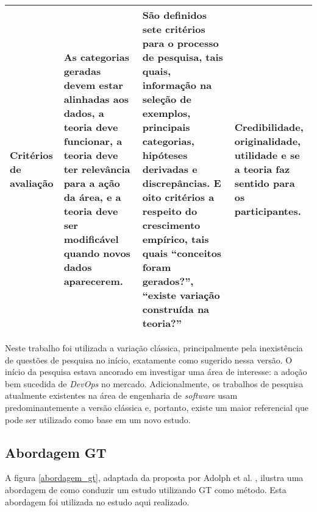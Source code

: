\begin{table}[hb!]
{\begin{tabular}{|p{3cm}|p{5.7cm}|p{5.7cm}|p{5.7cm}|}
\textbf{Critérios de avaliação}
& As categorias geradas devem estar alinhadas aos dados, a teoria deve funcionar, a teoria deve ter relevância para a ação da área, e a teoria deve ser modificável quando novos dados aparecerem.
& São definidos sete critérios para o processo de pesquisa, tais quais, informação na seleção de exemplos, principais categorias, hipóteses derivadas e discrepâncias. E oito critérios a respeito do crescimento empírico, tais quais ``conceitos foram gerados?'', ``existe variação construída na teoria?''
& Credibilidade, originalidade, utilidade e se a teoria faz sentido para os participantes. \\
\hline

\end{tabular}}
\end{table}

Neste trabalho foi utilizada a variação clássica, principalmente pela
inexistência de questões de pesquisa no início, exatamente como
sugerido nessa versão. O início da pesquisa estava ancorado em investigar uma
área de interesse: a adoção bem sucedida de \textit{DevOps} no mercado.
Adicionalmente, os trabalhos de pesquisa atualmente existentes na área
de engenharia de \textit{software} usam predominantemente a versão clássica
\cite{stol2016grounded} e, portanto, existe um maior referencial que pode ser
utilizado como base em um novo estudo.

\subsection{Abordagem \acrshort{GT}}

A figura \ref{abordagem_gt}, adaptada da proposta por Adolph et al.
\cite{using_gt_adolph}, ilustra uma abordagem de como conduzir um estudo
utilizando \acrshort{GT} como método. Esta abordagem foi utilizada no estudo
aqui realizado.

%

